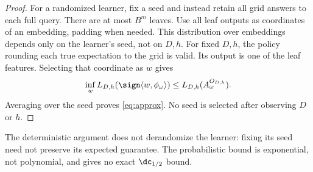 \begin{proof}
For a randomized learner, fix a seed and instead retain all grid answers to each full query. There are at most $B^m$ leaves. Use all leaf outputs as coordinates of an embedding, padding when needed. This distribution over embeddings depends only on the learner's seed, not on $D,h$. For fixed $D,h$, the policy rounding each true expectation to the grid is valid. Its output is one of the leaf features. Selecting that coordinate as $w$ gives
\[
 \inf_w L_{D,h}(\sign\langle w,\phi_\omega\rangle)
 \leq L_{D,h}(A_\omega^{O_{D,h}}).
\]
Averaging over the seed proves \eqref{eq:approx}. No seed is selected after observing $D$ or $h$.
\end{proof}

The deterministic argument does not derandomize the learner: fixing its seed need not preserve its expected guarantee. The probabilistic bound is exponential, not polynomial, and gives no exact $\dc_{1/2}$ bound.

